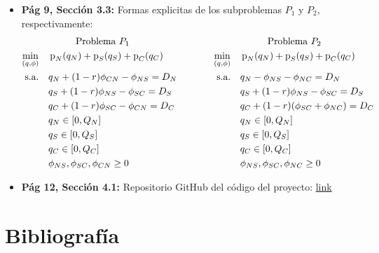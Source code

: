 \documentclass[12pt,twoside]{article}
\begin{document}
	\begin{itemize}
	\item \textbf{P\'ag 9, Secci\'on 3.3:} Formas explicitas de los subproblemas \(P_1\) y \(P_2\), respectivamente:
	\begin{equation*}\begin{aligned}
			& \text{\hspace{1cm}Problema \(P_1\)}& & \text{\hspace{1cm}Problema \(P_2\)}  \\
			\min_{(q,\phi)} \quad & \operatorname{p}_N(q_N)+\operatorname{p}_S(q_S)+\operatorname{p}_C(q_C) & \hspace{1cm} \min_{(q,\phi)} \quad & \operatorname{p}_N(q_N)+\operatorname{p}_S(q_S)+\operatorname{p}_C(q_C) \\
			\textrm{s.a.} \quad & q_N+(1-r)\phi_{CN}-\phi_{NS}=D_N & \textrm{s.a.} \quad & q_N-\phi_{NS}-\phi_{NC}=D_N \\
			& q_S+(1-r)\phi_{NS}-\phi_{SC}=D_S & & q_S+(1-r)\phi_{NS}-\phi_{SC}=D_S \\
			& q_C+(1-r)\phi_{SC}-\phi_{CN}=D_C & & q_C+(1-r)(\phi_{SC}+\phi_{NC})=D_C \\
			& q_N\in[0,Q_N] & & q_N\in[0,Q_N] \\
			& q_S\in[0,Q_S] & & q_S\in[0,Q_S] \\
			& q_C\in[0,Q_C] & & q_C\in[0,Q_C] \\
			& \phi_{NS},\phi_{SC},\phi_{CN}\geq0 & & \phi_{NS},\phi_{SC},\phi_{NC}\geq0 
	\end{aligned}\end{equation*}
		\item \textbf{P\'ag 12, Secci\'on 4.1:} Repositorio GitHub del c\'odigo del proyecto: \href{https://github.com/UFWM/USM_Lab_2023_S2/blob/main/LabModelacion.py}{link}
	\end{itemize}
	
	\section{Bibliograf\'ia}
	
\end{document}
